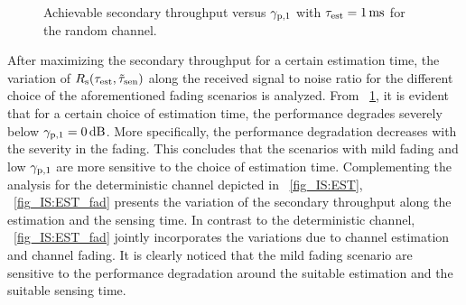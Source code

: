 {\begin{figure}[!ht]
\caption{Achievable secondary throughput versus ${\gamma}_{\text{p,1}}$ with $\tau_{\text{est}} = \SI{1}{ms}$ for the random channel.}
\label{fig_IS:optT_SNR_fad}
\end{figure}

After maximizing the secondary throughput for a certain estimation time, the variation of $R_{\text{s}}(\tau_{\text{est}}, \tilde{\tau}_{\text{sen}})$ along the received signal to noise ratio for the different choice of the aforementioned fading scenarios is analyzed. From \figurename~\ref{fig_IS:optT_SNR_fad}, it is evident that for a certain choice of estimation time, the performance degrades severely below ${\gamma}_{\text{p,1}} = \SI{0}{dB}$. More specifically, the performance degradation decreases with the severity in the fading. This concludes that the scenarios with mild fading and low ${\gamma}_{\text{p,1}}$ are more sensitive to the choice of estimation time. Complementing the analysis for the deterministic channel depicted in \figurename~\ref{fig_IS:EST}, \figurename~\ref{fig_IS:EST_fad} presents the variation of the secondary throughput along the estimation and the sensing time. In contrast to the deterministic channel, \figurename~\ref{fig_IS:EST_fad} jointly incorporates the variations due to channel estimation and channel fading. It is clearly noticed that the mild fading scenario are sensitive to the performance degradation around the suitable estimation and the suitable sensing time.


}
